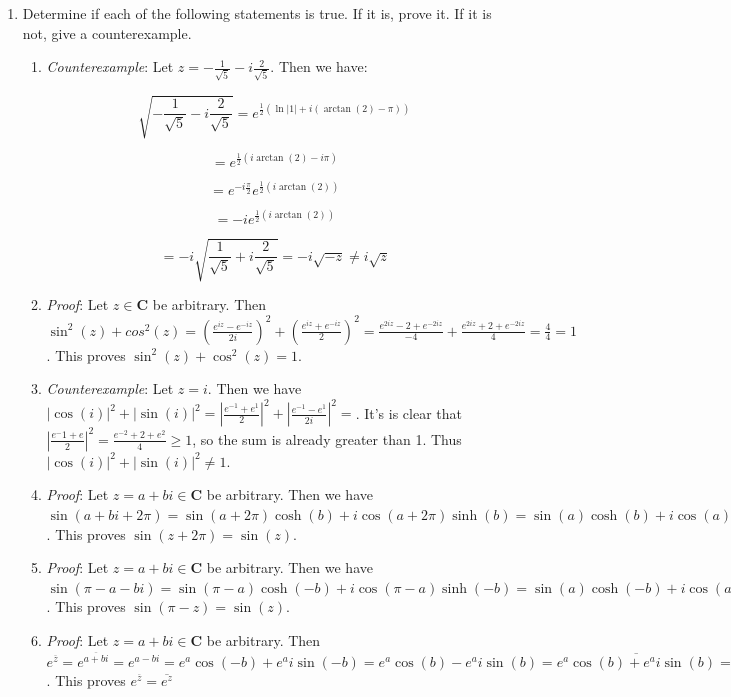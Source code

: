 \documentclass{article}
\newcommand{\C}{\mathbf{C}}
\begin{document}
\begin{enumerate}
	\item Determine if each of the following statements is true. If it is, prove it. If it is not, give a counterexample.
		\begin{enumerate}
			\item \textit{Counterexample}: Let $z=-\frac{1}{\sqrt{5}}-i\frac{2}{\sqrt{5}}$. Then we have:
			
			\[  \sqrt{-\frac{1}{\sqrt{5}}-i\frac{2}{\sqrt{5}}} =e^{\frac{1}{2}(\ln|1|+i(\arctan(2)-\pi))}  \]
			
			\[  =e^{\frac{1}{2}(i\arctan(2)-i\pi)}   \]
			
			\[  =e^{-i\frac{\pi}{2}}e^{\frac{1}{2}(i\arctan(2))}   \]
			
			\[  =-ie^{\frac{1}{2}(i\arctan(2))}   \]
			
			\[  =-i\sqrt{\frac{1}{\sqrt{5}}+i\frac{2}{\sqrt{5}}}=-i\sqrt{-z} \neq i\sqrt{z}   \]
			

			
			
			\item \textit{Proof}: Let $z \in \C$ be arbitrary. Then $\sin^2(z)+cos^2(z)=(\frac{e^{iz}-e^{-iz}}{2i})^2 + (\frac{e^{iz}+e^{-iz}}{2})^2=\frac{e^{2iz}-2+e^{-2iz}}{-4}+\frac{e^{2iz}+2+e^{-2iz}}{4}=\frac{4}{4}=1$. This proves $\sin^2(z)+\cos^2(z)=1$.
			
			\item \textit{Counterexample}: Let $z=i$. Then we have $|\cos(i)|^2+|\sin(i)|^2=| \frac{e^{-1}+e^{1}} {2} |^2+| \frac{e^{-1}-e^{1}} {2i} |^2=$. It's is clear that $|\frac{e^-1+e}{2}|^2=\frac{e^{-2}+2+e^2}{4}\geq 1$, so the sum is already greater than 1. Thus $|\cos(i)|^2+|\sin(i)|^2 \neq 1$.
			
			\item \textit{Proof}: Let $z = a+bi \in \C$ be arbitrary. Then we have $\sin(a+bi+2\pi)=\sin(a+2\pi)\cosh(b)+i\cos(a+2\pi)\sinh(b)=\sin(a)\cosh(b)+i\cos(a)\sinh(b)=\sin(a+bi)=sin(z)$. This proves $\sin(z+2\pi)=\sin(z)$.
			
			\item \textit{Proof}: Let $z = a+bi \in \C$ be arbitrary. Then we have $\sin(\pi-a-bi)=\sin(\pi-a)\cosh(-b)+i\cos(\pi-a)\sinh(-b)=\sin(a)\cosh(-b)+i\cos(a)\sinh(-b)=\sin(a)\cosh(b)+i\cos(a)\sinh(b)=\sin(a+bi)=sin(z)$. This proves $\sin(\pi-z)=\sin(z)$.
			
			\item \textit{Proof}: Let $z = a+bi \in \C$ be arbitrary. Then $e^{\overline{z}}=e^{\overline{a+bi}}=e^{a-bi}=e^a\cos(-b)+e^ai\sin(-b)=e^a\cos(b)-e^ai\sin(b)=\overline{e^a\cos(b)+e^ai\sin(b)}=\overline{e^{a+bi}}=\overline{e^z}$. This proves $e^{\overline{z}}=\overline{e^z} $
		\end{enumerate}
		

\end{enumerate}
\end{document}
